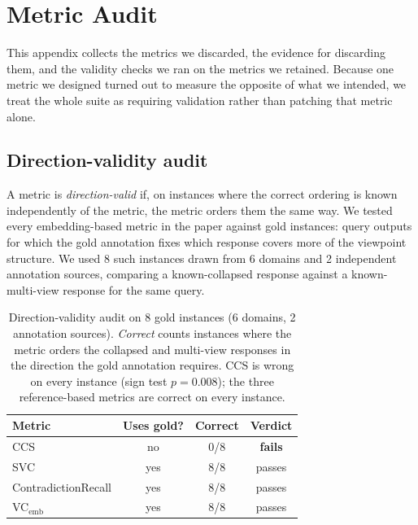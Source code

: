 \documentclass[11pt]{article}
\begin{document}

\section{Metric Audit}
\label{app:metric-audit}

This appendix collects the metrics we discarded, the evidence for discarding
them, and the validity checks we ran on the metrics we retained.  Because one
metric we designed turned out to measure the opposite of what we intended, we
treat the whole suite as requiring validation rather than patching that metric
alone.

\subsection{Direction-validity audit}
\label{sec:direction-audit}

A metric is \emph{direction-valid} if, on instances where the correct ordering
is known independently of the metric, the metric orders them the same way.  We
tested every embedding-based metric in the paper against gold instances: query
outputs for which the gold annotation fixes which response covers more of the
viewpoint structure.  We used 8 such instances drawn from 6 domains and 2
independent annotation sources, comparing a known-collapsed response against a
known-multi-view response for the same query.

\begin{table}[h]
\centering\small
\setlength{\tabcolsep}{4pt}
\begin{tabular}{@{}lccc@{}}
\toprule
\textbf{Metric} & \textbf{Uses gold?} & \textbf{Correct} & \textbf{Verdict} \\
\midrule
CCS               & no  & 0/8 & \textbf{fails} \\
SVC               & yes & 8/8 & passes \\
ContradictionRecall & yes & 8/8 & passes \\
VC$_\text{emb}$   & yes & 8/8 & passes \\
\bottomrule
\end{tabular}
\caption{Direction-validity audit on 8 gold instances (6 domains, 2 annotation
sources).  \emph{Correct} counts instances where the metric orders the
collapsed and multi-view responses in the direction the gold annotation
requires.  CCS is wrong on every instance (sign test $p{=}0.008$); the three
reference-based metrics are correct on every instance.}
\label{tab:direction}
\end{table}
\end{document}
